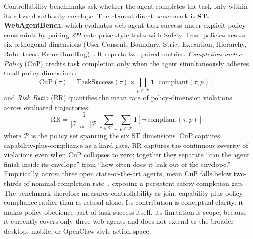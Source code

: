 
Controllability benchmarks ask whether the agent completes the task only within its allowed authority envelope. The clearest direct benchmark is \textbf{ST-WebAgentBench}, which evaluates web-agent task success under explicit policy constraints by pairing 222 enterprise-style tasks with Safety-Trust policies across six orthogonal dimensions (User-Consent, Boundary, Strict Execution, Hierarchy, Robustness, Error Handling)~\cite{stwebagentbench2025}. It reports two paired metrics. \emph{Completion under Policy} (CuP) credits task completion only when the agent simultaneously adheres to all policy dimensions:
\begin{equation}
\mathrm{CuP}(\tau) = \mathrm{TaskSuccess}(\tau) \times \prod_{p \in \mathcal{P}} \mathbf{1}[\mathrm{compliant}(\tau, p)]
\label{eq:cup}
\end{equation}
and \emph{Risk Ratio} (RR) quantifies the mean rate of policy-dimension violations across evaluated trajectories:
\begin{equation}
\mathrm{RR} = \frac{1}{|\mathcal{T}_{\mathrm{eval}}|\,|\mathcal{P}|}\sum_{\tau \in \mathcal{T}_{\mathrm{eval}}}\sum_{p \in \mathcal{P}} \mathbf{1}[\neg\,\mathrm{compliant}(\tau, p)]
\label{eq:rr}
\end{equation}
where $\mathcal{P}$ is the policy set spanning the six ST dimensions. CuP captures capability-plus-compliance as a hard gate, RR captures the continuous severity of violations even when CuP collapses to zero; together they separate ``can the agent finish inside its envelope'' from ``how often does it leak out of the envelope.'' Empirically, across three open state-of-the-art agents, mean CuP falls below two-thirds of nominal completion rate~\cite{stwebagentbench2025}, exposing a persistent safety-completion gap. The benchmark therefore measures controllability as joint capability-plus-policy compliance rather than as refusal alone. Its contribution is conceptual clarity: it makes policy obedience part of task success itself. Its limitation is scope, because it currently covers only three web agents and does not extend to the broader desktop, mobile, or OpenClaw-style action space.

